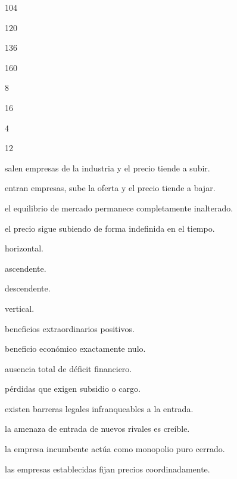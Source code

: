 \begin{opts}
    \item 104
    \item 120
    \item 136
    \item 160
\end{opts}

\begin{opts}
    \item 8
    \item 16
    \item 4
    \item 12
\end{opts}

\begin{opts}
    \item salen empresas de la industria y el precio tiende a subir.
    \item entran empresas, sube la oferta y el precio tiende a bajar.
    \item el equilibrio de mercado permanece completamente inalterado.
    \item el precio sigue subiendo de forma indefinida en el tiempo.
\end{opts}

\begin{opts}
    \item horizontal.
    \item ascendente.
    \item descendente.
    \item vertical.
\end{opts}

\begin{opts}
    \item beneficios extraordinarios positivos.
    \item beneficio económico exactamente nulo.
    \item ausencia total de déficit financiero.
    \item pérdidas que exigen subsidio o cargo.
\end{opts}

\begin{opts}
    \item existen barreras legales infranqueables a la entrada.
    \item la amenaza de entrada de nuevos rivales es creíble.
    \item la empresa incumbente actúa como monopolio puro cerrado.
    \item las empresas establecidas fijan precios coordinadamente.
\end{opts}

